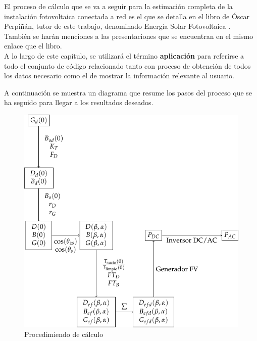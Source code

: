 
El proceso de cálculo que se va a seguir para la estimación completa de la instalación fotovoltaica conectada a red es el que se detalla en el libro de Óscar Perpiñán, tutor de este trabajo, denominado Energía Solar Fotovoltaica \cite{esf_book}. También se harán menciones a las presentaciones que se encuentran en el mismo enlace que el libro.\\

A lo largo de este capítulo, se utilizará el término \textbf{aplicación} para referirse a todo el conjunto de código relacionado tanto con proceso de obtención de todos los datos necesario como el de mostrar la información relevante al usuario.

A continuación se muestra un diagrama que resume los pasos del proceso que se ha seguido para llegar a los resultados deseados.

\begin{figure}[ht]
\includegraphics[scale=0.8]{diag_procedimiento_calculo}
\centering
\caption{Procedimiendo de cálculo}
\label{fig:diag_procedimiento_calculo}
\end{figure}

